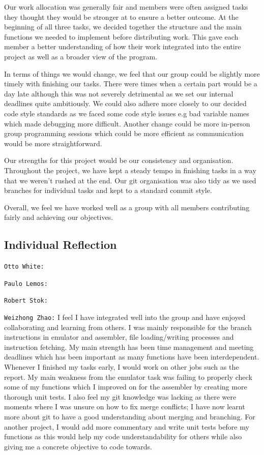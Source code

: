 \documentclass[11pt]{article}
\begin{document}
Our work allocation was generally fair and members were often assigned tasks they thought they would be stronger at to ensure a better outcome. At the beginning of all three tasks, we decided together the structure and the main functions we needed to implement before distributing work. This gave each member a better understanding of how their work integrated into the entire project as well as a broader view of the program.

In terms of things we would change, we feel that our group could be slightly more timely with finishing our tasks. There were times when a certain part would be a day late although this was not severely detrimental as we set our internal deadlines quite ambitiously. We could also adhere more closely to our decided code style standards as we faced some code style issues e.g bad variable names which made debugging more difficult. Another change could be more in-person group programming sessions which could be more efficient as communication would be more straightforward.

Our strengths for this project would be our consistency and organisation. Throughout the project, we have kept a steady tempo in finishing tasks in a way that we weren't rushed at the end. Our git organisation was also tidy as we used branches for individual tasks and kept to a standard commit style.

Overall, we feel we have worked well as a group with all members contributing fairly and achieving our objectives.

  \subsection*{Individual Reflection}

\texttt{Otto White:}

\texttt{Paulo Lemos:} 

\texttt{Robert Stok:} 

\texttt{Weizhong Zhao:} I feel I have integrated well into the group and have enjoyed collaborating and learning from others. I was mainly responsible for the branch instructions in emulator and assembler, file loading/writing processes and instruction fetching. My main strength has been time management and meeting deadlines which has been important as many functions have been interdependent. Whenever I finished my tasks early, I would work on other jobs such as the report. My main weakness from the emulator task was failing to properly check some of my functions which I improved on for the assembler by creating more thorough unit tests. I also feel my git knowledge was lacking as there were moments where I was unsure on how to fix merge conflicts; I have now learnt more about git to have a good understanding about merging and branching. For another project, I would add more commentary and write unit tests before my functions as this would help my code understandability for others while also giving me a concrete objective to code towards.
\end{document}
